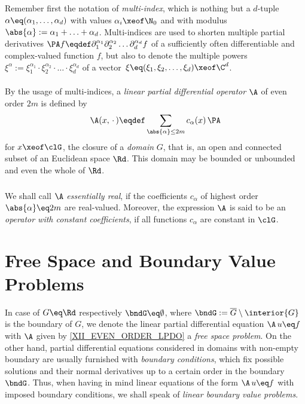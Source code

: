 \documentclass[11pt,twoside]{article}
\def\G{G}
\begin{document}
\subparagraph{} %
Remember first the notation of \textit{multi-index},
which is nothing but a $d$-tuple $\alpha \eq (\alpha_1,\ldots,\alpha_d)$
with values $\alpha_i \xeof \N_0$
and with modulus $\abs{\alpha} := \alpha_1 + \ldots + \alpha_d$.
Multi-indices are used to shorten multiple partial derivatives
$
\PA f \eqdef \partial_1^{\alpha_1}
             \partial_2^{\alpha_2} \ldots
             \partial_d^{\alpha_d} f
$
of a sufficiently often differentiable and complex-valued function $f$,
but also to denote the multiple powers
$\xi^{\alpha} := \xi_1^{\alpha_1}
\cdot \xi_2^{\alpha_2} \cdot \ldots \cdot \xi_d^{\alpha_d}$
of a vector $\,\xi \eq (\xi_1,\xi_2,\ldots,\xi_d) \xeof \C^d$.

\paragraph{} %
By the usage of multi-indices,
a \textit{linear partial differential operator} $\A$ of even order $2m$
is defined by
\begin{equation}\label{XII_EVEN_ORDER_LPDO}
\A(x,\,\cdot\,) \eqdef
\sum_{\abs{\alpha} \leq 2m} c_{\alpha}(x) \, \PA
\end{equation}
for $x \xeof \clG$,
the closure of a \textit{domain} $\G$,
that is,
an open and connected subset of an Euclidean space $\Rd$.
This domain may be bounded or unbounded and even the whole of $\Rd$.

\subparagraph{} %
We shall call $\A$ \textit{essentially real},
if the coefficients $c_{\alpha}$ of highest order $\abs{\alpha} \eq 2m$
are real-valued.
Moreover,
the expression $\A$ is said to be
an \textit{operator with constant coefficients},
if all functions $c_{\alpha}$ are constant in $\clG$.

\section{Free Space and Boundary Value Problems}
In case of $\G \eq \Rd$ respectively $\bndG \eq \emptyset$,
where $\bndG := \overline{\G} \setminus \interior{\G}$ is the boundary of $\G$,
we denote the linear partial differential equation $\A \, u \eq f$
with $\A$ given by \eqref{XII_EVEN_ORDER_LPDO} a \textit{free space problem}.
On the other hand,
partial differential equations considered in domains
with non-empty boundary are usually furnished with \textit{boundary conditions},
which fix possible solutions and their normal derivatives up to a certain order
in the boundary $\bndG$.
Thus,
when having in mind linear equations of the form $\A\,u \eq f$
with imposed boundary conditions,
we shall speak of \textit{linear boundary value problems}.
\end{document}
